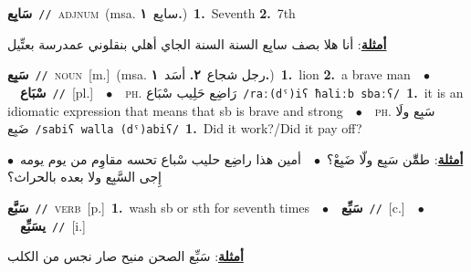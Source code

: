 \documentclass[10pt,a4paper,twoside]{article} %
\begin{document}
\begin{multicols}{2}
{\setlength\topsep{0pt}\textbf{\foreignlanguage{arabic}{سَابِع}}\ {\color{gray}\texttt{//}\color{black}}\ \textsc{adj\textunderscore num}\ \color{gray}(msa. \foreignlanguage{arabic}{سابِع}~\foreignlanguage{arabic}{\textbf{١.}})\color{black}\ \textbf{1.}~Seventh  \textbf{2.}~7th\  \begin{flushright}\color{gray}\foreignlanguage{arabic}{\textbf{\underline{\foreignlanguage{arabic}{أمثلة}}}: أنا هلا بصف سابِع السنة السنة الجاي أهلي بنقلوني عمدرسة بعتِّيل}\end{flushright}\color{black}} \vspace{2mm}

{\setlength\topsep{0pt}\textbf{\foreignlanguage{arabic}{سَبِع}}\ {\color{gray}\texttt{//}\color{black}}\ \textsc{noun}\ [m.]\ \color{gray}(msa. \foreignlanguage{arabic}{رجل شجاع}~\foreignlanguage{arabic}{\textbf{٢.}}  \foreignlanguage{arabic}{أسَد}~\foreignlanguage{arabic}{\textbf{١.}})\color{black}\ \textbf{1.}~lion  \textbf{2.}~a brave man\ \ $\bullet$\ \ \setlength\topsep{0pt}\textbf{\foreignlanguage{arabic}{سْبَاع}}\ {\color{gray}\texttt{//}\color{black}}\ [pl.]\ \ $\bullet$\ \ \textsc{ph.} \color{gray} \foreignlanguage{arabic}{رَاضِع حَلِيب سْبَاع}\color{black}\ {\color{gray}\texttt{/{\sffamily raː(dˤ)iʕ ħaliːb sbaːʕ}/}\color{black}}\ \textbf{1.}~it is an idiomatic expression that means that sb is brave and strong\ \ $\bullet$\ \ \textsc{ph.} \color{gray} \foreignlanguage{arabic}{سَبِع ولَا ضَبِع}\color{black}\ {\color{gray}\texttt{/{\sffamily sabiʕ walla (dˤ)abiʕ}/}\color{black}}\ \textbf{1.}~Did it work?/Did it pay off?\  \begin{flushright}\color{gray}\foreignlanguage{arabic}{\textbf{\underline{\foreignlanguage{arabic}{أمثلة}}}: طمِّّن سَبِع ولّا ضَبِعْ؟\ $\bullet$\ \  أمين هذا راضِع حليب سْباع تحسه مقاوِم من يوم يومه\ $\bullet$\ \  إِجى السَّبِع ولا بعده بالحراث؟}\end{flushright}\color{black}} \vspace{2mm}

{\setlength\topsep{0pt}\textbf{\foreignlanguage{arabic}{سَبَّع}}\ {\color{gray}\texttt{//}\color{black}}\ \textsc{verb}\ [p.]\ \textbf{1.}~wash sb or sth for seventh times\ \ $\bullet$\ \ \setlength\topsep{0pt}\textbf{\foreignlanguage{arabic}{سَبِّع}}\ {\color{gray}\texttt{//}\color{black}}\ [c.]\ \ $\bullet$\ \ \setlength\topsep{0pt}\textbf{\foreignlanguage{arabic}{يسَبِّع}}\ {\color{gray}\texttt{//}\color{black}}\ [i.]\  \begin{flushright}\color{gray}\foreignlanguage{arabic}{\textbf{\underline{\foreignlanguage{arabic}{أمثلة}}}: سَبِّع الصحن منيح صار نجس من الكلب}\end{flushright}\color{black}} \vspace{2mm}


\end{multicols}
\end{document}
